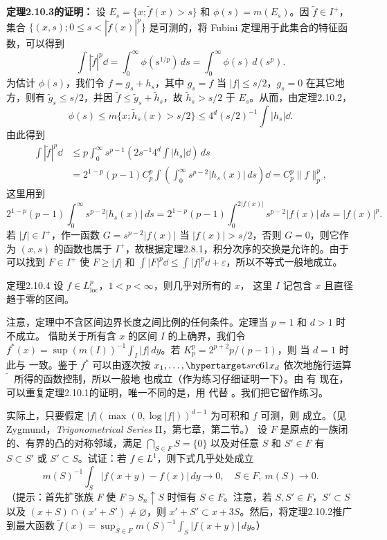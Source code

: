 \textbf{定理2.10.3的证明：} 设 $E_s=\{x;\widetilde f(x)>s\}$ 和 $\phi(s)=m(E_s)$。因 $\widetilde f\in I^+$，集合 $\{(x,s);0\le s<|\widetilde f(x)|^p\}$ 是可测的，将 Fubini 定理用于此集合的特征函数，可以得到
\[\int|\widetilde f|^p\dd=\int_0^\infty\phi(s^{1/p})\,ds=\int_0^\infty\phi(s)\,d(s^p).\]
为估计 $\phi(s)$，我们令 $f=g_s+h_s$，其中 $g_s=f$ 当 $|f|\le s/2$，$g_s=0$ 在其它地方，则有 $\widetilde g_s\le s/2$，并因 $\widetilde f\le\widetilde g_s+\widetilde h_s$，故 $\widetilde h_s>s/2$ 于 $E_s$。从而，由定理2.10.2，
\[\phi(s)\le m\{x;\widetilde h_s(x)>s/2\}\le4^d(s/2)^{-1}\int|h_s|\dd.\]
由此得到
\[\begin{aligned}\int|\widetilde f|^p\dd&\le p\int_0^\infty s^{p-1}\left(2s^{-1}4^d\int|h_s|\dd\right)\,ds\\&=2^{1-p}(p-1)C_p^p\int\left(\int_0^\infty s^{p-2}|h_s(x)|\,ds\right)\dd=C_p^p\|f\|_p^p,\end{aligned}\]
这里用到
\[2^{1-p}(p-1)\int_0^\infty s^{p-2}|h_s(x)|\,ds=2^{1-p}(p-1)\int_0^{2|f(x)|}s^{p-2}|f(x)|\,ds=|f(x)|^p.\]
若 $|f|\in I^+$，作一函数 $G=s^{p-2}|f(x)|$ 当 $|f(x)|>s/2$，否则 $G=0$，则它作为 $(x,s)$ 的函数也属于 $I^+$，故根据定理2.8.1，积分次序的交换是允许的。由于可以找到 $F\in I^+$ 使 $F\ge|f|$ 和 $\int|F|^p\dd\le\int|f|^p\dd+\varepsilon$，所以不等式一般地成立。
\begin{statement}{定理}{2.10.4}
设 $f\in L^p_{\mathrm{loc}}$，$1<p<\infty$，则几乎对所有的 $x$，
这里 $I$ 记包含 $x$ 且直径趋于零的区间。
\end{statement}
注意，定理中不含区间边界长度之间比例的任何条件。定理当 $p=1$ 和 $d>1$ 时不成立。
\Proof 借助关于所有含 $x$ 的区间 $I$ 的上确界，我们令 $f^*(x)=\sup(m(I))^{-1}\int_I|f|\,dy$。若 $K_p^p=2^{p+2}p/(p-1)$，则
当 $d=1$ 时此与  一致。鉴于 $f^*$ 可以由逐次按 $x_1,\ldots,
\SourcePage{61}
 x_d$ 依次地施行运算 $\widetilde{\phantom f}$ 所得的函数控制，所以一般地  也成立（作为练习仔细证明一下）。由  有
现在，可以重复定理2.10.1的证明，唯一不同的是，用  代替 。我们把它留作练习。

实际上，只要假定 $|f|(\max(0,\log|f|))^{d-1}$ 为可积和 $f$ 可测，则  成立。（见 Zygmund，\textit{Trigonometrical Series} II，第七章，第二节。）
\Exercise 设 $F$ 是原点的一族闭的、有界的凸的对称邻域，满足 $\bigcap_{S\in F}S=\{0\}$ 以及对任意 $S$ 和 $S'\in F$ 有 $S\subset S'$ 或 $S'\subset S$。试证：若 $f\in L^1$，则下式几乎处处成立
\[m(S)^{-1}\int_S|f(x+y)-f(x)|\,dy\longrightarrow0,\quad S\in F,\ m(S)\to0.\]
（提示：首先扩张族 $F$ 使 $F\ni S_n\uparrow S$ 时恒有 $\overline S\in F$。注意，若 $S,S'\in F$，$S'\subset S$ 以及 $(x+S)\cap(x'+S')\ne\varnothing$，则 $x'+S'\subset x+3S$。然后，将定理2.10.2推广到最大函数 $\widetilde f(x)=\sup_{S\in F}m(S)^{-1}\int_S|f(x+y)|\,dy$。）

